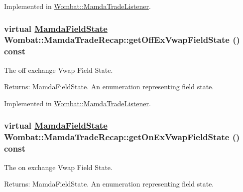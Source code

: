 Implemented in \hyperlink{classWombat_1_1MamdaTradeListener_c21118c78e3c119f6009e90ff1dfa922}{Wombat::Mamda\-Trade\-Listener}.\hypertarget{classWombat_1_1MamdaTradeRecap_73079a6a76e523eb7693e9102743ba7c}{
\subsubsection[getOffExVwapFieldState]{\setlength{\rightskip}{0pt plus 5cm}virtual \hyperlink{namespaceWombat_93aac974f2ab713554fd12a1fa3b7d2a}{Mamda\-Field\-State} Wombat::Mamda\-Trade\-Recap::get\-Off\-Ex\-Vwap\-Field\-State () const}}
\label{classWombat_1_1MamdaTradeRecap_73079a6a76e523eb7693e9102743ba7c}


The off exchange Vwap Field State. 

\begin{Desc}
\item[Returns:]Mamda\-Field\-State. An enumeration representing field state. \end{Desc}


Implemented in \hyperlink{classWombat_1_1MamdaTradeListener_218b607fb4f815873eea2fc4da9f4f8c}{Wombat::Mamda\-Trade\-Listener}.\hypertarget{classWombat_1_1MamdaTradeRecap_28e307415c29dc4a04b1790fabd3ad4f}{
\subsubsection[getOnExVwapFieldState]{\setlength{\rightskip}{0pt plus 5cm}virtual \hyperlink{namespaceWombat_93aac974f2ab713554fd12a1fa3b7d2a}{Mamda\-Field\-State} Wombat::Mamda\-Trade\-Recap::get\-On\-Ex\-Vwap\-Field\-State () const}}
\label{classWombat_1_1MamdaTradeRecap_28e307415c29dc4a04b1790fabd3ad4f}


The on exchange Vwap Field State. 

\begin{Desc}
\item[Returns:]Mamda\-Field\-State. An enumeration representing field state. \end{Desc}


